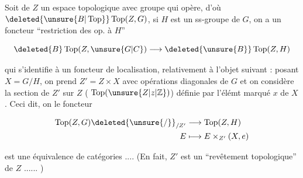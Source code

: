 Soit de   $Z$ un espace topologique avec  groupe  qui opère, d'où $\deleted{\unsure{B|\operatorname{Top}}}\operatorname{Top}(Z,G)$, si $H$ est un ss-groupe de $G$, on a un foncteur ``restriction des op. à $H$''

\[\deleted{B}\operatorname{Top}(Z,\unsure{G|C})\longrightarrow\deleted{\unsure{B}}\operatorname{Top}(Z,H)\]

qui s'identifie à un foncteur de localisation, relativement à l'objet  suivant : posant $X=G/H$, on prend $Z'=Z\times X$ avec opérations diagonales de $G$ et on considère la section  de $Z'$ sur $Z$ ( $\operatorname{Top}(\unsure{Z|z|\mathbb Z})$) définie par l'élémt marqué $x$ de $X$. Ceci dit, on  le foncteur

\[\begin{aligned}\operatorname{Top}(Z,G)\deleted{\unsure{/}}_{/Z'}&\longrightarrow\operatorname{Top}(Z,H)\\E&\longmapsto E\times_{Z'}(X,e)\end{aligned}\]

est une équivalence de catégories .... (En fait, $Z'$ est un ``revêtement topologique'' de $Z$ ...... )
